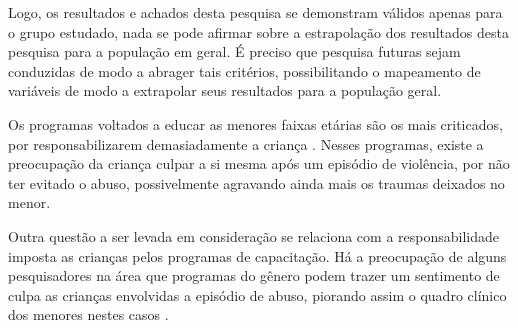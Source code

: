 

Logo, os resultados e achados desta pesquisa se demonstram válidos apenas para o grupo estudado, nada se pode afirmar sobre a estrapolação dos resultados desta pesquisa para a população em geral. É preciso que pesquisa futuras sejam conduzidas de modo a abrager tais critérios, possibilitando o mapeamento de variáveis de modo a extrapolar seus resultados para a população geral.

Os programas voltados a educar as menores faixas etárias são os mais criticados, por responsabilizarem demasiadamente a criança \cite{colleen2016advancing}. Nesses programas, existe a preocupação da criança culpar a si mesma após um episódio de violência, por não ter evitado o abuso, possivelmente agravando ainda mais os traumas deixados no menor.



\pagebreak

Outra questão a ser levada em consideração se relaciona com a responsabilidade imposta as crianças pelos programas de capacitação. Há a preocupação de alguns pesquisadores na área que programas do gênero podem trazer um sentimento de culpa as crianças envolvidas a episódio de abuso, piorando assim o quadro clínico dos menores nestes casos \cite{finkelhor2009prevention}. %

